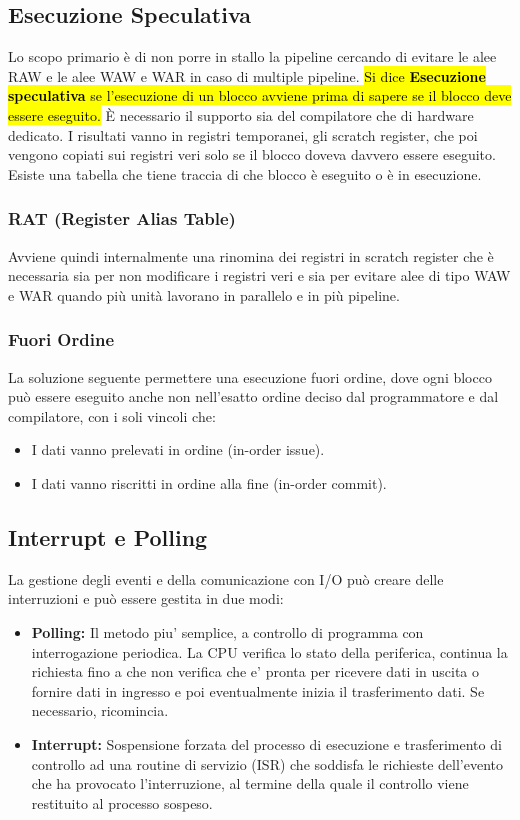 \documentclass{article}
\begin{document}
\subsection{Esecuzione Speculativa}
Lo scopo primario è di non porre in stallo la pipeline cercando di evitare le alee RAW e le alee WAW e WAR in caso di multiple pipeline.
\hl{Si dice \textbf{Esecuzione speculativa} se l’esecuzione di un blocco avviene prima di sapere se il blocco deve essere eseguito.}
È necessario il supporto sia del compilatore che di hardware dedicato.
I risultati vanno in registri temporanei, gli scratch register, che poi vengono copiati sui registri veri solo se il blocco doveva davvero essere eseguito.
Esiste una tabella che tiene traccia di che blocco è eseguito o è in esecuzione.

\subsubsection{RAT (Register Alias Table)}
Avviene quindi internalmente una rinomina dei registri in scratch register che è necessaria sia per non modificare i registri veri e sia per evitare alee di tipo WAW e WAR quando più unità lavorano in parallelo e in più pipeline.

\subsubsection{Fuori Ordine}
La soluzione seguente permettere una esecuzione fuori ordine, dove ogni blocco può essere eseguito anche non nell’esatto ordine deciso dal programmatore e dal compilatore, con i soli vincoli che:
\begin{itemize}
    \item I dati vanno prelevati in ordine (in-order issue).
    \item I dati vanno riscritti in ordine alla fine (in-order commit).
\end{itemize}

\subsection{Interrupt e Polling}
La gestione degli eventi e della comunicazione con I/O può creare delle interruzioni e può essere gestita in due modi:
\begin{itemize}
    \item \textbf{Polling:} Il metodo piu’ semplice, a controllo di programma con interrogazione periodica. La CPU verifica lo stato della periferica, continua la richiesta fino a che non verifica che e’ pronta per ricevere dati in uscita o fornire dati in ingresso e poi eventualmente inizia il trasferimento dati. Se necessario, ricomincia.
    \item \textbf{Interrupt:} Sospensione forzata del processo di esecuzione e trasferimento di controllo ad una routine di servizio (ISR) che soddisfa le richieste dell'evento che ha provocato l'interruzione, al termine della quale il controllo viene restituito al processo sospeso.
\end{itemize}
\end{document}

